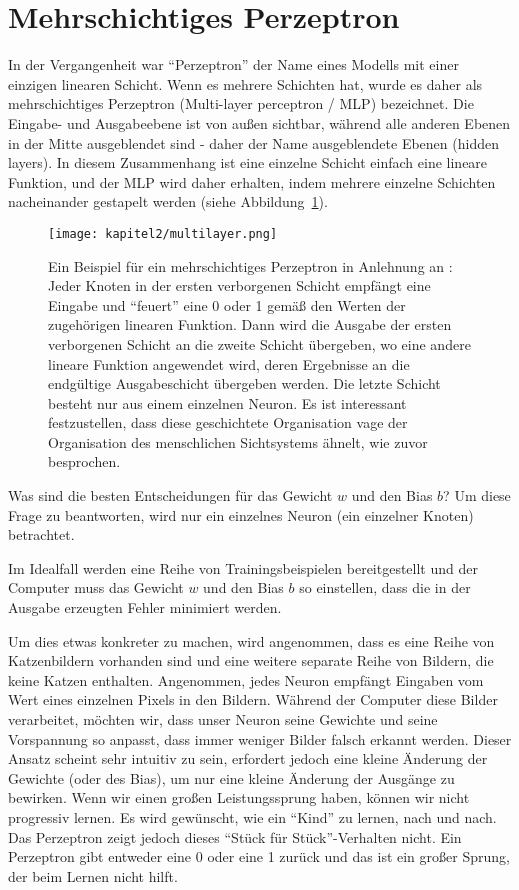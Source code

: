 \section{Mehrschichtiges Perzeptron}
In der Vergangenheit war \enquote{Perzeptron} der Name eines Modells mit einer einzigen linearen Schicht. Wenn es mehrere Schichten hat, wurde es daher als mehrschichtiges Perzeptron (Multi-layer perceptron / MLP) bezeichnet. Die Eingabe- und Ausgabeebene  ist von außen sichtbar, während alle anderen Ebenen in der Mitte ausgeblendet sind - daher der Name ausgeblendete Ebenen (hidden layers). In diesem Zusammenhang ist eine einzelne Schicht einfach eine lineare Funktion, und der MLP wird daher erhalten, indem mehrere einzelne Schichten nacheinander gestapelt werden (siehe Abbildung~\ref{Kap2:Multi}).

\begin{figure}[H]
  \centering
  \texttt{[image: kapitel2/multilayer.png]}
  \caption[Das mehrschichtige Perzeptron]{Ein Beispiel für ein mehrschichtiges Perzeptron in Anlehnung an \cite{Taylor2017}: Jeder Knoten in der ersten verborgenen Schicht empfängt eine Eingabe und \enquote{feuert} eine 0 oder 1 gemäß den Werten der zugehörigen linearen Funktion. Dann wird die Ausgabe der ersten verborgenen Schicht an die zweite Schicht übergeben, wo eine andere lineare Funktion angewendet wird, deren Ergebnisse an die endgültige Ausgabeschicht übergeben werden. Die letzte Schicht besteht nur aus einem einzelnen Neuron. Es ist interessant festzustellen, dass diese geschichtete Organisation vage der Organisation des menschlichen Sichtsystems ähnelt, wie zuvor besprochen.}
  \label{Kap2:Multi}
\end{figure}

Was sind die besten Entscheidungen für das Gewicht $w$ und den Bias $b$? Um diese Frage zu beantworten, wird nur ein einzelnes Neuron (ein einzelner Knoten) betrachtet.

Im Idealfall werden eine Reihe von Trainingsbeispielen bereitgestellt und der Computer muss das Gewicht $w$ und den Bias $b$ so einstellen, dass die in der Ausgabe erzeugten Fehler minimiert werden.

Um dies etwas konkreter zu machen, wird angenommen, dass es eine Reihe von Katzenbildern vorhanden sind und eine weitere separate Reihe von Bildern, die keine Katzen enthalten. Angenommen, jedes Neuron empfängt Eingaben vom Wert eines einzelnen Pixels in den Bildern. Während der Computer diese Bilder verarbeitet, möchten wir, dass unser Neuron seine Gewichte und seine Vorspannung so anpasst, dass immer weniger Bilder falsch erkannt werden.
Dieser Ansatz scheint sehr intuitiv zu sein, erfordert jedoch eine kleine Änderung der Gewichte (oder des Bias), um nur eine kleine Änderung der Ausgänge zu bewirken. Wenn wir einen großen Leistungssprung haben, können wir nicht progressiv lernen. Es wird gewünscht, wie ein \enquote{Kind} zu lernen, nach und nach. Das Perzeptron zeigt jedoch dieses \enquote{Stück für Stück}-Verhalten nicht. Ein Perzeptron gibt entweder eine 0 oder eine 1 zurück und das ist ein großer Sprung, der beim Lernen nicht hilft.


